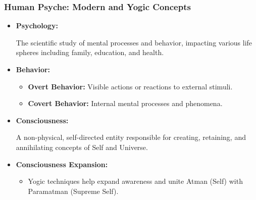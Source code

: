 \begin{frame}[fragile]\frametitle{Human Psyche: Modern and Yogic Concepts}

      \begin{itemize}
        \item \textbf{Psychology:}
        
        The scientific study of mental processes and behavior, impacting various life spheres including family, education, and health.
        
        \item \textbf{Behavior:}
        \begin{itemize}
            \item \textbf{Overt Behavior:} Visible actions or reactions to external stimuli.
            \item \textbf{Covert Behavior:} Internal mental processes and phenomena.
        \end{itemize}
        \item \textbf{Consciousness:}
        
        A non-physical, self-directed entity responsible for creating, retaining, and annihilating concepts of Self and Universe.
        
        \item \textbf{Consciousness Expansion:}
        \begin{itemize}
            \item Yogic techniques help expand awareness and unite Atman (Self) with Paramatman (Supreme Self).
        \end{itemize}
      \end{itemize}

\end{frame}

